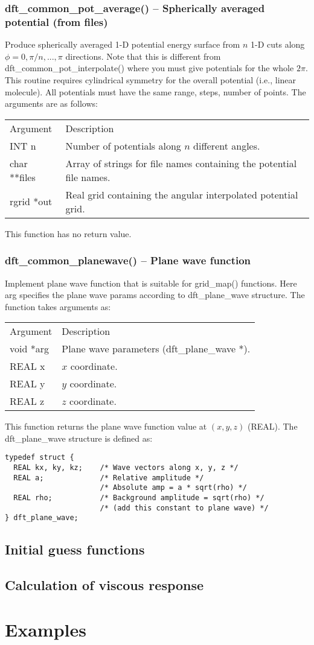 \documentclass[12pt,letterpaper]{report}
\begin{document}
\subsection{dft\_common\_pot\_average() -- Spherically averaged potential (from files)}

Produce spherically averaged 1-D potential energy surface from $n$ 1-D cuts along $\phi = 0, \pi/n, ..., \pi$ directions. Note that this is different from dft\_common\_pot\_interpolate() where you must give potentials for the whole $2\pi$. 
This routine requires cylindrical symmetry for the overall potential (i.e., linear molecule). All potentials must have the same range, steps, number of points. The arguments are as follows:
\begin{longtable}{p{} p{}}
Argument & Description\\
\cline{1-2}
INT n  & Number of potentials along $n$ different angles.\\
char **files & Array of strings for file names containing the potential file names.\\
rgrid *out & Real grid containing the angular interpolated potential grid.\\
\end{longtable}
\noindent
This function has no return value.

\subsection{dft\_common\_planewave() -- Plane wave function}

Implement plane wave function that is suitable for grid\_map() functions. Here arg specifies the plane wave params according to dft\_plane\_wave structure. The function takes arguments as:
\begin{longtable}{p{} p{}}
Argument & Description\\
\cline{1-2}
void *arg & Plane wave parameters (dft\_plane\_wave *).\\
REAL x & $x$ coordinate.\\
REAL y & $y$ coordinate.\\
REAL z & $z$ coordinate.\\
\end{longtable}
\noindent
This function returns the plane wave function value at $(x, y, z)$ (REAL). The dft\_plane\_wave structure is defined as:
\begin{verbatim}
typedef struct {
  REAL kx, ky, kz;    /* Wave vectors along x, y, z */
  REAL a;             /* Relative amplitude */
                      /* Absolute amp = a * sqrt(rho) */
  REAL rho;           /* Background amplitude = sqrt(rho) */
                      /* (add this constant to plane wave) */
} dft_plane_wave;
\end{verbatim}


\section{Initial guess functions}

\section{Calculation of viscous response}

\chapter{Examples}
\end{document}
